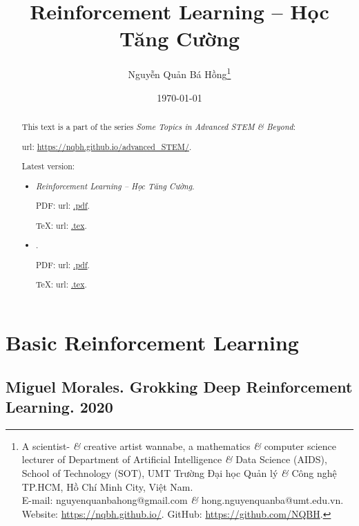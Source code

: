 \documentclass{article}
\title{Reinforcement Learning -- Học Tăng Cường}
\author{Nguyễn Quản Bá Hồng\footnote{A scientist- {\it\&} creative artist wannabe, a mathematics {\it\&} computer science lecturer of Department of Artificial Intelligence {\it\&} Data Science (AIDS), School of Technology (SOT), UMT Trường Đại học Quản lý {\it\&} Công nghệ TP.HCM, Hồ Chí Minh City, Việt Nam.\\E-mail: {\sf nguyenquanbahong@gmail.com} {\it\&} {\sf hong.nguyenquanba@umt.edu.vn}. Website: \url{https://nqbh.github.io/}. GitHub: \url{https://github.com/NQBH}.}}
\date{\today}
\begin{document}
\maketitle
\begin{abstract}
    This text is a part of the series {\it Some Topics in Advanced STEM \& Beyond}:

    {\sc url}: \url{https://nqbh.github.io/advanced_STEM/}.

    Latest version:
    \begin{itemize}
        \item {\it Reinforcement Learning -- Học Tăng Cường}.

        PDF: {\sc url}: \url{.pdf}.

        \TeX: {\sc url}: \url{.tex}.
        \item {\it }.

        PDF: {\sc url}: \url{.pdf}.

        \TeX: {\sc url}: \url{.tex}.
    \end{itemize}
\end{abstract}
\tableofcontents


\section{Basic Reinforcement Learning}


\subsection{{\sc Miguel Morales}. Grokking Deep Reinforcement Learning. 2020}
\end{document}
